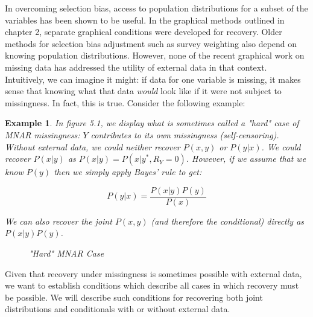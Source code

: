 \documentclass[12pt,twoside]{reedthesis}
\newtheorem{example}{Example}
\theoremstyle{definition}
\begin{document}
In overcoming selection bias,  access to population distributions for a subset of the variables has been shown to be useful. In the graphical methods outlined in chapter 2, separate graphical conditions were developed for recovery. Older methods for selection bias adjustment such as survey weighting also depend on knowing population distributions. However, none of the recent graphical work on missing data has addressed the utility of external data in that context. Intuitively, we can imagine it might: if data for one variable is missing, it makes sense that knowing what that data \emph{would} look like if it were not subject to missingness. In fact, this is true. Consider the following example:

\begin{example}
In figure 5.1, we display what is sometimes called a "hard" case of MNAR missingness: $Y$ contributes to its own missingness (self-censoring). Without external data, we could neither recover $P(x,y)$ or $P(y|x)$. We could recover $P(x | y)$ as $P(x | y) = P(x | y^*, R_Y = 0)$. However, if we assume that we know $P(y)$ then we simply apply Bayes' rule to get:

$$P(y | x) = \frac{P(x|y)P(y)}{P(x)}$$

We can also recover the joint $P(x,y)$ (and therefore the conditional) directly as $P(x| y)P(y)$.
\begin{figure}
\centering
{}
\caption{"Hard" MNAR Case} \label{fig:MissingExternal}
\end{figure}
\end{example}

Given that recovery under missingness is sometimes possible with external data, we want to establish conditions which describe all cases in which recovery must be possible. We will describe such conditions for recovering both joint distributions and conditionals with or without external data.
\end{document}
